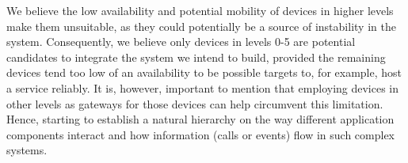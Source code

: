 We believe the low availability and potential mobility of devices in higher levels make them unsuitable, as they could potentially be a source of instability in the system. Consequently,  we believe only devices in levels 0-5 are potential candidates to integrate the system we intend to build, provided the remaining devices tend too low of an availability to be possible targets to, for example, host a service reliably. It is, however, important to mention that employing devices in other levels as gateways for those devices can help circumvent this limitation. Hence, starting to establish a natural hierarchy on the way different application components interact and how information (calls or events) flow in such complex systems.
